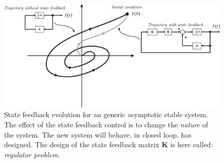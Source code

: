 \documentclass[11pt,a4paper,oneside]{book}
\numberwithin{equation}{section}
\theoremstyle{it}
\theoremstyle{definition}
\begin{document}
\begin{figure}[H]
	\centering
	\includegraphics[width = 450pt, 
	keepaspectratio]{figures/state_fb/state_feedback/state_feedback_evolution.eps}
	\captionsetup{width=0.5\textwidth, font=small}
	\caption{State feedback evolution for an generic asymptotic stable system. 
		The effect of the state feedback control is to change the \textit{nature} 
		of the system. The new system will behave, in closed loop, has designed. The design of the state feedback matrix $\mathbf{K}$ is here called: \textit{regulator problem}.}
	\label{state_feedback_evolution}
\end{figure}
\end{document}
